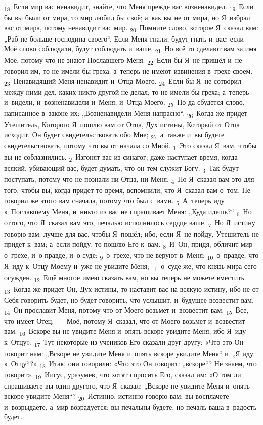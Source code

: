 \documentclass[a4paper,12pt]{article}
\begin{document}
\textsubscript{18}~Если мир вас ненавидит, знайте, что Меня прежде вас возненавидел. \textsubscript{19}~Если бы вы были от мира, то мир любил бы своё; а~как вы не от мира, но Я~избрал вас от мира, потому ненавидит вас мир. \textsubscript{20}~Помните слово, которое Я~сказал вам: „Раб не больше господина своего“. Если Меня гнали, будут гнать и~вас; если Моё слово соблюдали, будут соблюдать и~ваше. \textsubscript{21}~Но всё то сделают вам за имя Моё, потому что не знают Пославшего Меня. \textsubscript{22}~Если бы Я~не пришёл и~не говорил им, то не имели бы греха; а~теперь не имеют извинения в~грехе своем. \textsubscript{23}~Ненавидящий Меня ненавидит и~Отца Моего. \textsubscript{24}~Если бы Я~не сотворил между ними дел, каких никто другой не делал, то не имели бы греха; а~теперь и~видели, и~возненавидели и~Меня, и~Отца Моего. \textsubscript{25}~Но да сбудется слово, написанное в~законе их: „Возненавидели Меня напрасно“. \textsubscript{26}~Когда же придет Утешитель, Которого Я~пошлю вам от Отца, Дух истины, Который от Отца исходит, Он будет свидетельствовать обо Мне; \textsubscript{27}~а~также и~вы будете свидетельствовать, потому что вы от начала со Мной. \textsubscript{1}~Это сказал Я~вам, чтобы вы не соблазнились. \textsubscript{2}~Изгонят вас из синагог; даже наступает время, когда всякий, убивающий вас, будет думать, что он тем служит Богу. \textsubscript{3}~Так будут поступать, потому что не познали ни Отца, ни Меня. \textsubscript{4}~Но Я~сказал вам это для того, чтобы вы, когда придет то время, вспомнили, что Я~сказал вам о~том. Не говорил же этого вам сначала, потому что был с~вами. \textsubscript{5}~А~теперь иду к~Пославшему Меня, и~никто из вас не спрашивает Меня: „Куда идешь?“ \textsubscript{6}~Но оттого, что Я~сказал вам это, печалью исполнилось сердце ваше. \textsubscript{7}~Но Я~истину говорю вам: лучше для вас, чтобы Я~пошёл; ибо, если Я~не пойду, Утешитель не придет к~вам; а~если пойду, то пошлю Его к~вам. \textsubscript{8}~И~Он, придя, обличит мир о~грехе, и~о правде, и~о суде: \textsubscript{9}~о~грехе, что не веруют в~Меня; \textsubscript{10}~о~правде, что Я~иду к~Отцу Моему и~уже не увидите Меня; \textsubscript{11}~о~суде же, что князь мира сего осужден. \textsubscript{12}~Ещё многое имею сказать вам, но вы теперь не можете вместить. \textsubscript{13}~Когда же придет Он, Дух истины, то наставит вас на всякую истину, ибо не от Себя говорить будет, но будет говорить, что услышит, и~будущее возвестит вам. \textsubscript{14}~Он прославит Меня, потому что от Моего возьмет и~возвестит вам. \textsubscript{15}~Все, что имеет Отец,~--- Моё, потому Я~сказал, что от Моего возьмет и~возвестит вам. \textsubscript{16}~Вскоре вы не увидите Меня и~опять вскоре увидите Меня, ибо Я~иду к~Отцу». \textsubscript{17}~Тут некоторые из учеников Его сказали друг другу: «Что это Он говорит нам: „Вскоре не увидите Меня и~опять вскоре увидите Меня“ и~„Я иду к~Отцу“?» \textsubscript{18}~Итак, они говорили: «Что это Он говорит: „вскоре“? Не знаем, что говорит». \textsubscript{19}~Иисус, уразумев, что хотят спросить Его, сказал им: «О том ли спрашиваете вы один другого, что Я~сказал: „Вскоре не увидите Меня и~опять вскоре увидите Меня“? \textsubscript{20}~Истинно, истинно говорю вам: вы восплачете и~возрыдаете, а~мир возрадуется; вы печальны будете, но печаль ваша в~радость будет. 
\end{document}
